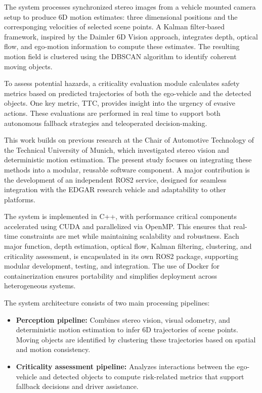 The system processes synchronized stereo images from a vehicle mounted camera 
setup to produce 6D motion estimates: three dimensional positions and the corresponging
velocities of selected scene points. A Kalman filter-based framework, inspired by the 
Daimler 6D Vision approach, integrates depth, optical flow, and ego-motion 
information to compute these estimates. The resulting motion field is clustered 
using the \gls{DBSCAN} algorithm to identify coherent moving objects.

To assess potential hazards, a criticality evaluation module calculates safety 
metrics based on predicted trajectories of both the ego-vehicle and the detected 
objects. One key metric, \gls{TTC}, provides insight into the 
urgency of evasive actions. These evaluations are performed in real time to 
support both autonomous fallback strategies and teleoperated decision-making.

This work builds on previous research at the Chair of Automotive Technology of the Technical University of Munich, 
which investigated stereo vision and deterministic motion estimation. The 
present study focuses on integrating these methods into a modular, reusable 
software component. A major contribution is the development of an independent 
\gls{ROS2} service, designed for seamless integration with the EDGAR research vehicle and 
adaptability to other platforms.

The system is implemented in C++, with performance critical components 
accelerated using \gls{CUDA} and parallelized via OpenMP. This ensures 
that real-time constraints are met while maintaining scalability and robustness. 
Each major function, depth estimation, optical flow, Kalman filtering, clustering, 
and criticality assessment, is encapsulated in its own \gls{ROS2} package, supporting modular 
development, testing, and integration. The use of Docker for containerization 
ensures portability and simplifies deployment across heterogeneous systems.

The system architecture consists of two main processing pipelines:

\begin{itemize}
  \item \textbf{Perception pipeline:} Combines stereo vision, visual odometry, and 
  deterministic motion estimation to infer 6D trajectories of scene points. 
  Moving objects are identified by clustering these trajectories based on spatial 
  and motion consistency.

  \item \textbf{Criticality assessment pipeline:} Analyzes interactions between 
  the ego-vehicle and detected objects to compute risk-related metrics that 
  support fallback decisions and driver assistance.
\end{itemize}


